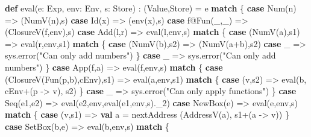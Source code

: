 \documentclass[]{article}
\newenvironment{Shaded}{}{}
\newcommand{\FunctionTok}[1]{\textcolor[rgb]{0.02,0.16,0.49}{#1}}
\newcommand{\KeywordTok}[1]{\textcolor[rgb]{0.00,0.44,0.13}{\textbf{#1}}}
\newcommand{\NormalTok}[1]{#1}
\newcommand{\StringTok}[1]{\textcolor[rgb]{0.25,0.44,0.63}{#1}}
\begin{document}
\begin{Shaded}
\begin{Highlighting}[]
\KeywordTok{def} \FunctionTok{eval}\NormalTok{(e: Exp, env: Env, s: Store) : (Value,Store) = e }\KeywordTok{match}\NormalTok{ \{}
  \KeywordTok{case} \FunctionTok{Num}\NormalTok{(n) =\textgreater{} (}\FunctionTok{NumV}\NormalTok{(n),s)}
  \KeywordTok{case} \FunctionTok{Id}\NormalTok{(x) =\textgreater{} (}\FunctionTok{env}\NormalTok{(x),s)}
  \KeywordTok{case}\NormalTok{ f@}\FunctionTok{Fun}\NormalTok{(\_,\_) =\textgreater{} (}\FunctionTok{ClosureV}\NormalTok{(f,env),s)}
  \KeywordTok{case} \FunctionTok{Add}\NormalTok{(l,r) =\textgreater{} }\FunctionTok{eval}\NormalTok{(l,env,s) }\KeywordTok{match}\NormalTok{ \{}
    \KeywordTok{case}\NormalTok{ (}\FunctionTok{NumV}\NormalTok{(a),s1) =\textgreater{} }\FunctionTok{eval}\NormalTok{(r,env,s1) }\KeywordTok{match}\NormalTok{ \{}
      \KeywordTok{case}\NormalTok{ (}\FunctionTok{NumV}\NormalTok{(b),s2) =\textgreater{} (}\FunctionTok{NumV}\NormalTok{(a+b),s2)}
      \KeywordTok{case}\NormalTok{ \_ =\textgreater{} sys.}\FunctionTok{error}\NormalTok{(}\StringTok{"Can only add numbers"}\NormalTok{)}
\NormalTok{    \}}
    \KeywordTok{case}\NormalTok{ \_ =\textgreater{} sys.}\FunctionTok{error}\NormalTok{(}\StringTok{"Can only add numbers"}\NormalTok{)}
\NormalTok{  \}}
  \KeywordTok{case} \FunctionTok{App}\NormalTok{(f,a) =\textgreater{} }\FunctionTok{eval}\NormalTok{(f,env,s) }\KeywordTok{match}\NormalTok{ \{}
    \KeywordTok{case}\NormalTok{ (}\FunctionTok{ClosureV}\NormalTok{(}\FunctionTok{Fun}\NormalTok{(p,b),cEnv),s1) =\textgreater{} }\FunctionTok{eval}\NormalTok{(a,env,s1) }\KeywordTok{match}\NormalTok{ \{}
      \KeywordTok{case}\NormalTok{ (v,s2) =\textgreater{} }\FunctionTok{eval}\NormalTok{(b, cEnv+(p {-}\textgreater{} v), s2)}
\NormalTok{    \}}
    \KeywordTok{case}\NormalTok{ \_ =\textgreater{} sys.}\FunctionTok{error}\NormalTok{(}\StringTok{"Can only apply functions"}\NormalTok{)}
\NormalTok{  \}}
  \KeywordTok{case}\NormalTok{ Seq(e1,e2) =\textgreater{}}
    \FunctionTok{eval}\NormalTok{(e2,env,}\FunctionTok{eval}\NormalTok{(e1,env,s).}\FunctionTok{\_2}\NormalTok{)}
  \KeywordTok{case} \FunctionTok{NewBox}\NormalTok{(e) =\textgreater{} }\FunctionTok{eval}\NormalTok{(e,env,s) }\KeywordTok{match}\NormalTok{ \{}
    \KeywordTok{case}\NormalTok{ (v,s1) =\textgreater{}}
      \KeywordTok{val}\NormalTok{ a = nextAddress}
\NormalTok{      (}\FunctionTok{AddressV}\NormalTok{(a), s1+(a {-}\textgreater{} v))}
\NormalTok{  \}}
  \KeywordTok{case} \FunctionTok{SetBox}\NormalTok{(b,e) =\textgreater{} }\FunctionTok{eval}\NormalTok{(b,env,s) }\KeywordTok{match}\NormalTok{ \{}

\end{Highlighting}
\end{Shaded}
\end{document}
